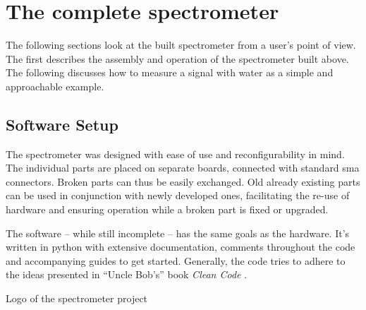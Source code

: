 \chapter{The complete spectrometer}

The following sections look at the built spectrometer from a user's point of view. The first  describes the assembly and operation of the spectrometer built above. The following  discusses how to measure a signal with water as a simple and approachable example.

\section{Software Setup}
The spectrometer was designed with ease of use and reconfigurability in mind. The individual parts are placed on separate boards, connected with standard \acrshort{sma} connectors. Broken parts can thus be easily exchanged. Old already existing parts can be used in conjunction with newly developed ones, facilitating the re-use of hardware and ensuring operation while a broken part is fixed or upgraded.

The software -- while still incomplete -- has the same goals as the hardware. It's written in \gls{python} with extensive documentation, comments throughout the code and accompanying guides to get started. Generally, the code tries to adhere to the ideas presented in \enquote{Uncle Bob's} book \textit{Clean Code} .

\begin{marginfigure}
    
    \caption{Logo of the \magnethical{} spectrometer project}
\end{marginfigure}

